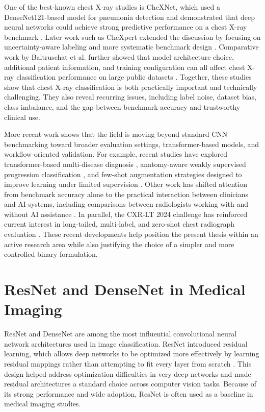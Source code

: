 One of the best-known chest X-ray studies is CheXNet, which used a DenseNet121-based model for pneumonia detection and demonstrated that deep neural networks could achieve strong predictive performance on a chest X-ray benchmark \cite{ref:rajpurkar2017}. Later work such as CheXpert extended the discussion by focusing on uncertainty-aware labeling and more systematic benchmark design \cite{ref:irvin2019}. Comparative work by Baltruschat et al. further showed that model architecture choice, additional patient information, and training configuration can all affect chest X-ray classification performance on large public datasets \cite{ref:baltruschat2019}. Together, these studies show that chest X-ray classification is both practically important and technically challenging. They also reveal recurring issues, including label noise, dataset bias, class imbalance, and the gap between benchmark accuracy and trustworthy clinical use.

More recent work shows that the field is moving beyond standard CNN benchmarking toward broader evaluation settings, transformer-based models, and workflow-oriented validation. For example, recent studies have explored transformer-based multi-disease diagnosis \cite{ref:huang2024vit}, anatomy-aware weakly supervised progression classification \cite{ref:yu2024}, and few-shot augmentation strategies designed to improve learning under limited supervision \cite{ref:lin2024fewshot}. Other work has shifted attention from benchmark accuracy alone to the practical interaction between clinicians and AI systems, including comparisons between radiologists working with and without AI assistance \cite{ref:guo2024}. In parallel, the CXR-LT 2024 challenge has reinforced current interest in long-tailed, multi-label, and zero-shot chest radiograph evaluation \cite{ref:lin2025cxrlt}. These recent developments help position the present thesis within an active research area while also justifying the choice of a simpler and more controlled binary formulation.

\section{ResNet and DenseNet in Medical Imaging}
ResNet and DenseNet are among the most influential convolutional neural network architectures used in image classification. ResNet introduced residual learning, which allows deep networks to be optimized more effectively by learning residual mappings rather than attempting to fit every layer from scratch \cite{ref:he2016}. This design helped address optimization difficulties in very deep networks and made residual architectures a standard choice across computer vision tasks. Because of its strong performance and wide adoption, ResNet is often used as a baseline in medical imaging studies.

